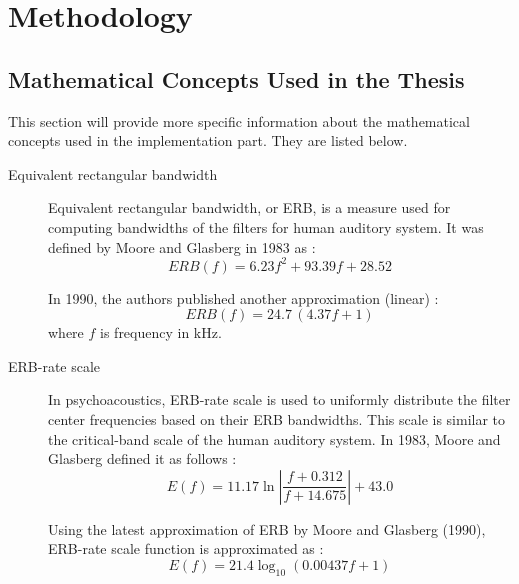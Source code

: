 \chapter{Methodology}\label{chapter:methodology}

\section{Mathematical Concepts Used in the Thesis}\label{section:math_concepts}

This section will provide more specific information about the mathematical concepts used in the implementation part. They are listed below.

\begin{description}
	\item[Equivalent rectangular bandwidth] Equivalent rectangular bandwidth, or ERB, is a measure used for computing bandwidths of the filters for human auditory system. It was defined by Moore and Glasberg in 1983 as \cite{Moore1983}\cite{Holdsworth1988}:
	\begin{equation}
		ERB(f) = 6.23f^2 + 93.39f + 28.52
	\end{equation} 
	
	In 1990, the authors published another approximation (linear) \cite{Moore1990}\cite{Wang2006}:
	\begin{equation}
		ERB(f) = 24.7\,(4.37f + 1)
		\label{equation:ERB_1990}
	\end{equation}
	where $f$ is frequency in kHz.
	
	\item[ERB-rate scale] In psychoacoustics, ERB-rate scale is used to uniformly distribute the filter center frequencies based on their ERB bandwidths. This scale is similar to the critical-band scale of the human auditory system. In 1983, Moore and Glasberg defined it as follows \cite{Moore1983}:
	\begin{equation}
		E(f) = 11.17\ln\left|\frac{f + 0.312}{f + 14.675}\right| + 43.0
	\end{equation}
	
	Using the latest approximation of ERB by Moore and Glasberg (1990), ERB-rate scale function is approximated as \cite{Moore1990}\cite{Wang2006}:
	\begin{equation}
		E(f) = 21.4\log_{10}\left(0.00437f + 1\right)
	\end{equation}
	

\end{description}

